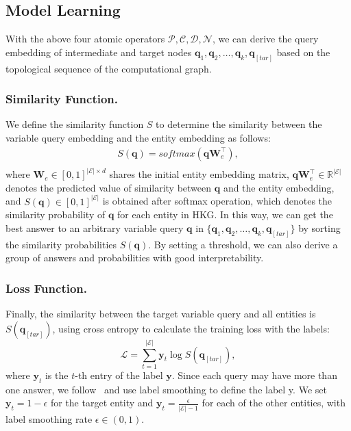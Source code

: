 \documentclass[letterpaper]{article} \usepackage{aaai23}  \usepackage{times}  \usepackage{helvet}  \usepackage{courier}  \usepackage[hyphens]{url}  \usepackage{graphicx} \urlstyle{rm} \def\UrlFont{\rm}  \usepackage{natbib}  \usepackage{caption} \frenchspacing  \setlength{\pdfpagewidth}{8.5in}  \setlength{\pdfpageheight}{11in}  \usepackage{algorithm}
\begin{document}
\subsection{Model Learning}
\label{4.4}

With the above four atomic operators $\mathcal{P},\mathcal{C},\mathcal{D},\mathcal{N}$, we can derive the query embedding of intermediate and target nodes $\boldsymbol{q}_1,\boldsymbol{q}_2,\ldots,\boldsymbol{q}_k, \boldsymbol{q}_{[tar]}$ based on the topological sequence of the computational graph. 


\subsubsection{Similarity Function.}
We define the similarity function $S$ to determine the similarity between the variable query embedding and the entity embedding as follows:
\begin{equation}
\begin{aligned}
S(\boldsymbol{q})=softmax(\boldsymbol{q}\mathbf{W}_e^\top),\\
\end{aligned}
\end{equation}
where $\mathbf{W}_e\in [0,1]^{|\mathcal{E}|\times d}$ shares the initial entity embedding matrix, $\boldsymbol{q}\mathbf{W}_e^\top\in \mathbb{R}^{|\mathcal{E}|}$ denotes the predicted value of similarity between $\boldsymbol{q}$ and the entity embedding, and $S(\boldsymbol{q})\in [0,1]^{|\mathcal{E}|}$ is obtained after softmax operation, which denotes the similarity probability of $\boldsymbol{q}$ for each entity in HKG. In this way, we can get the best answer to an arbitrary variable query $\boldsymbol{q}$ in $\{\boldsymbol{q}_1,\boldsymbol{q}_2,\ldots,\boldsymbol{q}_k, \boldsymbol{q}_{[tar]}\}$ by sorting the similarity probabilities $S(\boldsymbol{q})$. By setting a threshold, we can also derive a group of answers and probabilities with good interpretability.

\subsubsection{Loss Function.}
Finally, the similarity between the target variable query and all entities is $S(\boldsymbol{q}_{[tar]})$, using cross entropy to calculate the training loss with the labels:
\begin{equation}
\mathcal{L}=\sum_{t=1}^{|\mathcal{E}|}{\mathbf{y}_t\log S(\boldsymbol{q}_{[tar]})},
\end{equation}
where $\mathbf{y}_t$ is the $t$-th entry of the label $\mathbf{y}$. Since each query may have more than one answer, we follow~\citep{GRAN} and use label smoothing to define the label y. We set $\mathbf{y}_t = 1- \epsilon$ for the target entity and $\mathbf{y}_t=\frac{\epsilon}{|\mathcal{E}|-1}$ for each of the other entities, with label smoothing rate $\epsilon \in (0,1)$.
\end{document}
